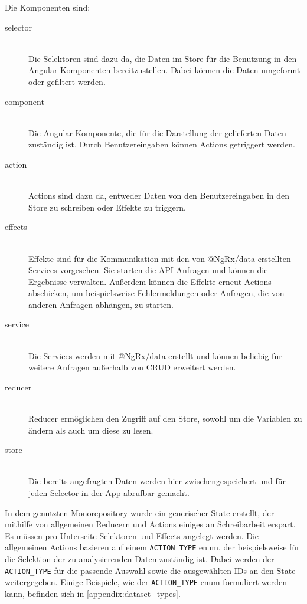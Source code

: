 Die Komponenten sind:
\begin{description}
    \item[selector]\hfill \\
    Die Selektoren sind dazu da, die Daten im Store für die Benutzung in den Angular-Komponenten bereitzustellen. Dabei können die Daten umgeformt oder gefiltert werden.
    \item[component]\hfill \\
    Die Angular-Komponente, die für die Darstellung der gelieferten Daten zuständig ist. Durch Benutzereingaben können Actions getriggert werden.
    \item[action]\hfill \\
    Actions sind dazu da, entweder Daten von den Benutzereingaben in den Store zu schreiben oder Effekte zu triggern. 
    \item[effects]\hfill \\
    Effekte sind für die Kommunikation mit den von @NgRx/data erstellten Services vorgesehen. Sie starten die API-Anfragen und können die Ergebnisse verwalten. Außerdem können die Effekte erneut Actions abschicken, um beispielsweise Fehlermeldungen oder Anfragen, die von anderen Anfragen abhängen, zu starten.
    \item[service]\hfill \\
    Die Services werden mit @NgRx/data erstellt und können beliebig für weitere Anfragen außerhalb von CRUD erweitert werden.
    \item[reducer]\hfill \\
    Reducer ermöglichen den Zugriff auf den Store, sowohl um die Variablen zu ändern als auch um diese zu lesen. 
    \item[store]\hfill \\
    Die bereits angefragten Daten werden hier zwischengespeichert und für jeden Selector in der App abrufbar gemacht.
\end{description}
In dem genutzten Monorepository wurde ein generischer State erstellt, der mithilfe von allgemeinen Reducern und Actions einiges an Schreibarbeit erspart. Es müssen pro Unterseite Selektoren und Effects angelegt werden. Die allgemeinen Actions basieren auf einem \texttt{ACTION\_TYPE} enum, der beispielsweise für die Selektion der zu analysierenden Daten zuständig ist. Dabei werden der \texttt{ACTION\_TYPE} für die passende Auswahl sowie die ausgewählten IDs an den State weitergegeben. Einige Beispiele, wie der \texttt{ACTION\_TYPE} enum formuliert werden kann, befinden sich in \ref{appendix:dataset_types}. 

